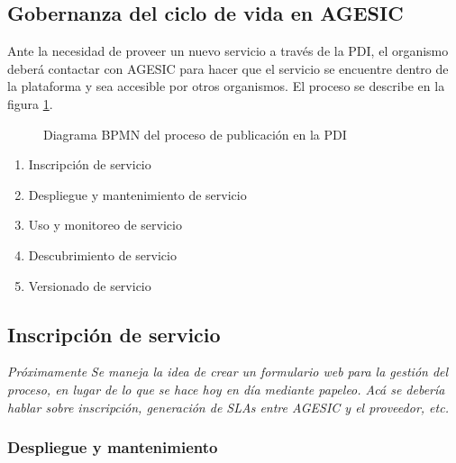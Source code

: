 \documentclass[11pt]{article}
\begin{document}
		\subsection{Gobernanza del ciclo de vida en AGESIC}
			\label{sec:ciclo_de_vida_en_agesic}

			Ante la necesidad de proveer un nuevo servicio a través de la PDI, el organismo deberá contactar con AGESIC para hacer que el servicio se encuentre dentro de la plataforma y sea accesible por otros organismos. El proceso se describe en la figura \ref{imagen:proceso_publicacion_pdi}.

			\begin{figure}[h]
				\centering
				\caption{Diagrama BPMN del proceso de publicación en la PDI}
				\label{imagen:proceso_publicacion_pdi}
			\end{figure}

			\begin{enumerate}
				\item Inscripción de servicio
				\item Despliegue y mantenimiento de servicio
				\item Uso y monitoreo de servicio
				\item Descubrimiento de servicio
				\item Versionado de servicio
			\end{enumerate}

			\subsection{Inscripción de servicio}
				\label{subsec:inscripcion}
				\emph{Próximamente}
				\emph{Se maneja la idea de crear un formulario web para la gestión del proceso, en lugar de lo que se hace hoy en día mediante papeleo. Acá se debería hablar sobre inscripción, generación de SLAs entre AGESIC y el proveedor, etc.}

			\subsubsection{Despliegue y mantenimiento}
				\label{subsec:despliegue}
\end{document}
